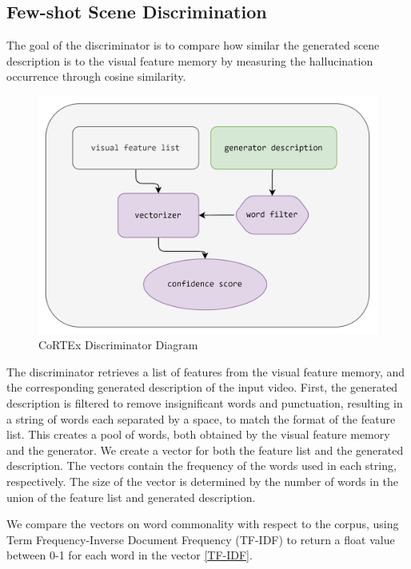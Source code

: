 \documentclass[conference]{IEEEtran}
\begin{document}
\subsection{Few-shot Scene Discrimination}

The goal of the discriminator is to compare how similar the generated scene description is to the visual feature memory by measuring the hallucination occurrence through cosine similarity.

\begin{figure}[H]
\centering
\includegraphics[width=\columnwidth]{discriminator.png}
\caption{CoRTEx Discriminator Diagram}
\label{fig:image}
\end{figure}

The discriminator retrieves a list of features from the visual feature memory, and the corresponding generated description of the input video. First, the generated description is filtered to remove insignificant words and punctuation, resulting in a string of words each separated by a space, to match the format of the feature list. This creates a pool of words, both obtained by the visual feature memory and the generator. We create a vector for both the feature list and the generated description. The vectors contain the frequency of the words used in each string, respectively. The size of the vector is determined by the number of words in the union of the feature list and generated description.

We compare the vectors on word commonality with respect to the corpus, using Term Frequency-Inverse Document Frequency (TF-IDF) to return a float value between 0-1 for each word in the vector \ref{TF-IDF}.
\end{document}
